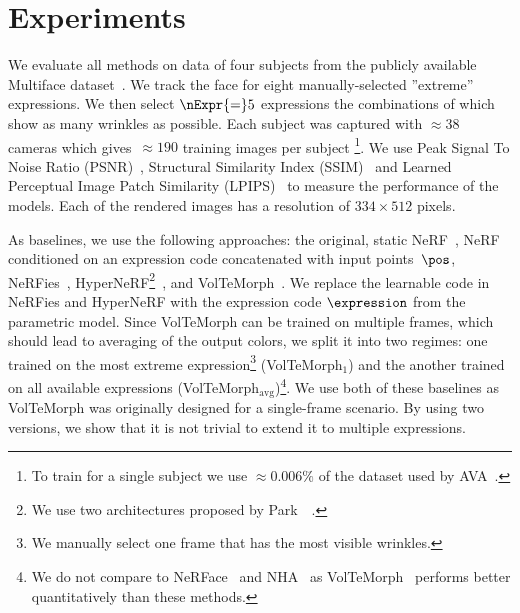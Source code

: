 % 




\section{Experiments}
  \label{sec:blendfields-experiments}

  We evaluate all methods on data of four subjects from the publicly available
  Multiface dataset~\cite{wuu2022multiface}.
  We track the face for eight manually-selected ''extreme'' expressions.
  We then select $\nExpr{=}5$ expressions the combinations of which show as
  many wrinkles as possible.
  Each subject was captured with $\approx\!
    \!38$ cameras which gives~$\approx\!\!190$ training images per subject
  \footnote{To train \blendfields for a single subject we use $\approx0.006\%$ of the dataset used by AVA~\cite{cao2022authentic}.}.
  We use Peak Signal To Noise Ratio (PSNR)~\cite{avcibas2002statistical},
  Structural Similarity Index (SSIM)~\cite{wang2003multiscale} and Learned
  Perceptual Image Patch Similarity (LPIPS)~\cite{zhang2018perceptual} to
  measure the performance of the models.
  Each of the rendered images has a resolution of $334{\times}512$ pixels.

  As baselines, we use the following approaches: the original, static
  NeRF~\cite{mildenhall2020nerf}, NeRF conditioned on an expression code
  concatenated with input points~$\pos$, NeRFies~\cite{park2021nerfies},
  HyperNeRF\footnote{We use two architectures proposed by
  Park~\etal~\cite{park2021hypernerf}.
  }~\cite{park2021hypernerf}, and VolTeMorph~\cite{garbin2024voltemorph}.
  We replace the learnable code in NeRFies and HyperNeRF with the expression
  code $\expression$ from the parametric model.
  Since VolTeMorph can be trained on multiple frames, which should lead to
  averaging of the output colors, we split it into two regimes: one trained on
  the most extreme expression\footnote{We manually select one frame that has
  the most visible wrinkles.
  } (VolTeMorph$_1$) and the another trained on all available expressions (VolTeMorph$_\text{avg}$)\footnote{We do not compare to NeRFace~\cite{gafni2021dynamic} and NHA~\cite{neural_head_avatars} as VolTeMorph~\cite{garbin2024voltemorph} performs better quantitatively than these methods.}.
  We use both of these baselines as VolTeMorph was originally designed for a
  single-frame scenario.
  By using two versions, we show that it is not trivial to extend it to
  multiple expressions.

